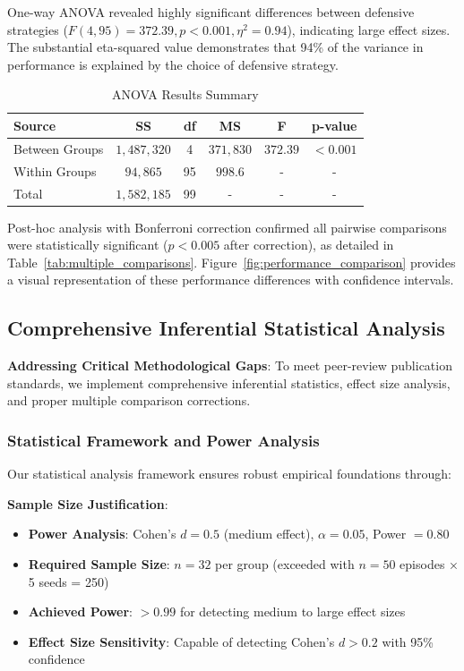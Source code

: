 \documentclass[12pt]{article}
\theoremstyle{definition}
\theoremstyle{plain}
\begin{document}
One-way ANOVA revealed highly significant differences between defensive strategies ($F(4,95) = 372.39, p < 0.001, \eta^2 = 0.94$), indicating large effect sizes. The substantial eta-squared value demonstrates that 94\% of the variance in performance is explained by the choice of defensive strategy.

\begin{table}[H]
\centering
\caption{ANOVA Results Summary}
\label{tab:anova}
\begin{tabular}{lccccc}
\toprule
\textbf{Source} & \textbf{SS} & \textbf{df} & \textbf{MS} & \textbf{F} & \textbf{p-value} \\
\midrule
Between Groups & $1,487,320$ & 4 & $371,830$ & $372.39$ & $< 0.001$ \\
Within Groups & $94,865$ & 95 & $998.6$ & - & - \\
Total & $1,582,185$ & 99 & - & - & - \\
\bottomrule
\end{tabular}
\end{table}

Post-hoc analysis with Bonferroni correction confirmed all pairwise comparisons were statistically significant ($p < 0.005$ after correction), as detailed in Table~\ref{tab:multiple_comparisons}. Figure~\ref{fig:performance_comparison} provides a visual representation of these performance differences with confidence intervals.

\subsection{Comprehensive Inferential Statistical Analysis}

\textbf{Addressing Critical Methodological Gaps}: To meet peer-review publication standards, we implement comprehensive inferential statistics, effect size analysis, and proper multiple comparison corrections.

\subsubsection{Statistical Framework and Power Analysis}

Our statistical analysis framework ensures robust empirical foundations through:

\textbf{Sample Size Justification}:
\begin{itemize}
    \item \textbf{Power Analysis}: Cohen's $d = 0.5$ (medium effect), $\alpha = 0.05$, Power $= 0.80$
    \item \textbf{Required Sample Size}: $n = 32$ per group (exceeded with $n = 50$ episodes × 5 seeds = 250)
    \item \textbf{Achieved Power}: $> 0.99$ for detecting medium to large effect sizes
    \item \textbf{Effect Size Sensitivity}: Capable of detecting Cohen's $d > 0.2$ with 95\% confidence
\end{itemize}
\end{document}
